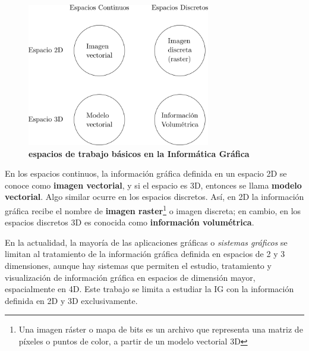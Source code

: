 \begin{figure}[h]
\includegraphics[width=8cm]{Img/CPD/grafica0.png}
\centering
\caption{\textbf{\footnotesize{ espacios de trabajo básicos en la Informática Gráfica}}}
\label{fig:grafica0}
\end{figure}

En los espacios continuos, la información gráfica definida en un espacio 2D se conoce como \textbf{imagen vectorial}, y si el espacio es 3D, entonces se llama \textbf{modelo vectorial}. Algo similar ocurre en los espacios discretos. Así, en 2D la información gráfica recibe el nombre de \textbf{imagen raster}\footnote{Una imagen ráster o mapa de bits es un archivo que representa una matriz de píxeles o puntos de color, a partir de un modelo vectorial 3D} o imagen discreta; en cambio, en los espacios discretos 3D es conocida como \textbf{información volumétrica}.

En la actualidad, la mayoría de las aplicaciones gráficas o \textit{sistemas gráficos} se limitan al tratamiento de la información gráfica definida en espacios de 2 y 3 dimensiones, aunque hay sistemas que permiten el estudio, tratamiento y visualización de información gráfica en espacios de dimensión mayor, espacialmente en 4D. Este trabajo se limita a estudiar la IG con la información definida en 2D y 3D exclusivamente.

